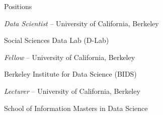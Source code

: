 \begin{rubric}{Positions}

\entry*[2013--present] \emph{Data Scientist} -- University of California, Berkeley
\par Social Sciences Data Lab (D-Lab)

\entry*[2014--present] \emph{Fellow} -- University of California, Berkeley
\par Berkeley Institute for Data Science (BIDS)

\entry*[2014] \emph{Lecturer} -- University of California, Berkeley
\par School of Information Masters in Data Science

\end{rubric}
